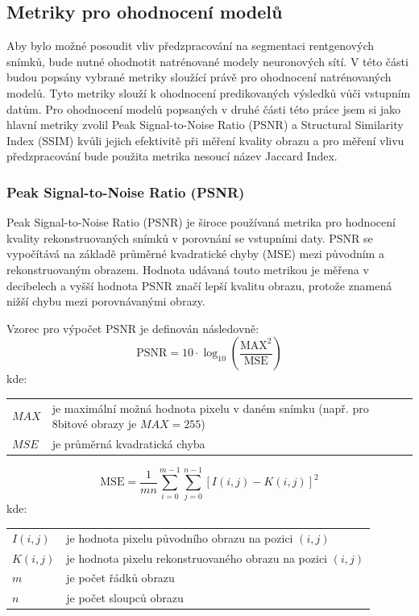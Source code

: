 \documentclass[male,czech,api_ing]{thesis}
\makeatletter
\newenvironment{conditions}[1][kde:]
    {#1 \begin{tabular}[t]{>{$}l<{$} @{${}={}$} >{\raggedright\arraybackslash}p{10cm}}}
    {\end{tabular}}
\makeatother
\begin{document}
\subsection{Metriky pro ohodnocení modelů}
Aby bylo možné posoudit vliv předzpracování na segmentaci rentgenových snímků, bude nutné ohodnotit natrénované modely neuronových sítí. V této části budou popsány vybrané metriky sloužící právě pro ohodnocení natrénovaných modelů. Tyto metriky slouží k ohodnocení predikovaných výsledků vůči vstupním datům. Pro ohodnocení modelů popsaných v druhé části této práce jsem si jako hlavní metriky zvolil Peak Signal-to-Noise Ratio (PSNR) a Structural Similarity Index (SSIM) kvůli jejich efektivitě při měření kvality obrazu a pro měření vlivu předzpracování bude použita metrika nesoucí název Jaccard Index.

\subsubsection{Peak Signal-to-Noise Ratio (PSNR)}
Peak Signal-to-Noise Ratio (PSNR) je široce používaná metrika pro hodnocení kvality rekonstruovaných snímků v porovnání se vstupními daty. PSNR se vypočítává na základě průměrné kvadratické chyby (MSE) mezi původním a rekonstruovaným obrazem. Hodnota udávaná touto metrikou je měřena v decibelech a vyšší hodnota PSNR značí lepší kvalitu obrazu, protože znamená nižší chybu mezi porovnávanými obrazy. \cite{PSNRSSIM}

Vzorec pro výpočet PSNR je definován následovně:
\begin{equation}
    \text{PSNR} = 10 \cdot \log_{10} \left( \frac{\text{MAX}^2}{\text{MSE}} \right)
\end{equation}
\begin{conditions}
    MAX &  je maximální možná hodnota pixelu v daném snímku (např. pro 8bitové obrazy je $MAX = 255$) \\
    MSE &  je průměrná kvadratická chyba
\end{conditions}

\begin{equation}
    \text{MSE} = \frac{1}{mn} \sum_{i=0}^{m-1} \sum_{j=0}^{n-1} [I(i,j) - K(i,j)]^2
\end{equation}
\begin{conditions}
    I(i,j) &  je hodnota pixelu původního obrazu na pozici $(i, j)$ \\
    K(i,j) &  je hodnota pixelu rekonstruovaného obrazu na pozici $(i, j)$ \\
    m &  je počet řádků obrazu \\
    n &  je počet sloupců obrazu
\end{conditions}
\end{document}
